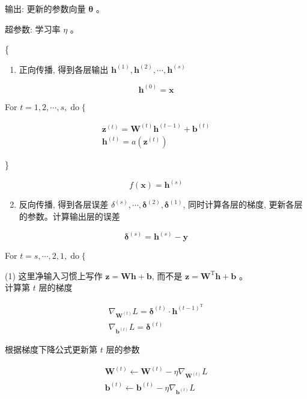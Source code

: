 \documentclass[10pt]{article}
\begin{document}
\begin{CJK*}{UTF8}{bsmi}
输出: 更新的参数向量 $\boldsymbol{\theta}$ 。

超参数: 学习率 $\eta$ 。

\{

\begin{enumerate}
  \item 正向传播, 得到各层输出 $\boldsymbol{h}^{(1)}, \boldsymbol{h}^{(2)}, \cdots, \boldsymbol{h}^{(s)}$
\end{enumerate}

$$
\boldsymbol{h}^{(0)}=\boldsymbol{x}
$$

For $t=1,2, \cdots, s, \operatorname{do}\{$

$$
\begin{gathered}
\boldsymbol{z}^{(t)}=\boldsymbol{W}^{(t)} \boldsymbol{h}^{(t-1)}+\boldsymbol{b}^{(t)} \\
\boldsymbol{h}^{(t)}=a\left(\boldsymbol{z}^{(t)}\right)
\end{gathered}
$$

\}

$$
f(\boldsymbol{x})=\boldsymbol{h}^{(s)}
$$

\begin{enumerate}
  \setcounter{enumi}{1}
  \item 反向传播, 得到各层误差 $\delta^{(s)}, \cdots, \boldsymbol{\delta}^{(2)}, \boldsymbol{\delta}^{(1)}$, 同时计算各层的梯度, 更新各层的参数。计算输出层的误差
\end{enumerate}

$$
\boldsymbol{\delta}^{(s)}=\boldsymbol{h}^{(s)}-\boldsymbol{y}
$$

For $t=s, \cdots, 2,1, \operatorname{do}\{$

(1) 这里净输入习惯上写作 $\boldsymbol{z}=\boldsymbol{W} \boldsymbol{h}+\boldsymbol{b}$, 而不是 $\boldsymbol{z}=\boldsymbol{W}^{\mathrm{T}} \boldsymbol{h}+\boldsymbol{b}$ 。\\
计算第 $t$ 层的梯度

$$
\begin{gathered}
\nabla_{\boldsymbol{W}^{(t)}} L=\boldsymbol{\delta}^{(t)} \cdot \boldsymbol{h}^{(t-1)^{\mathrm{T}}} \\
\nabla_{\boldsymbol{b}^{(t)}} L=\boldsymbol{\delta}^{(t)}
\end{gathered}
$$

根据梯度下降公式更新第 $t$ 层的参数

$$
\begin{gathered}
\boldsymbol{W}^{(t)} \leftarrow \boldsymbol{W}^{(t)}-\eta \nabla_{\boldsymbol{W}^{(t)}} L \\
\boldsymbol{b}^{(t)} \leftarrow \boldsymbol{b}^{(t)}-\eta \nabla_{\boldsymbol{b}^{(t)}} L
\end{gathered}
$$


\end{CJK*}
\end{document}

